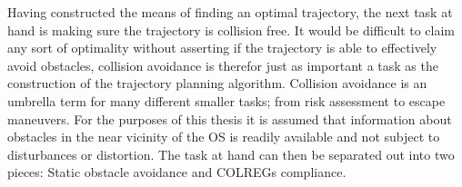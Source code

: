 Having constructed the means of finding an optimal trajectory, the next task at hand is making sure the trajectory is collision free.
It would be difficult to claim any sort of optimality without asserting if the trajectory is able to effectively avoid obstacles, collision avoidance is
therefor just as important a task as the construction of the trajectory planning algorithm. Collision avoidance is an umbrella term for many
different smaller tasks; from risk assessment to escape maneuvers. For the purposes of this thesis it is assumed that information 
about obstacles in the near vicinity of the \gls{OS} is readily available and not subject to disturbances or distortion.
The task at hand can then be separated out into two pieces: Static obstacle avoidance and \gls{COLREGs} compliance. 


